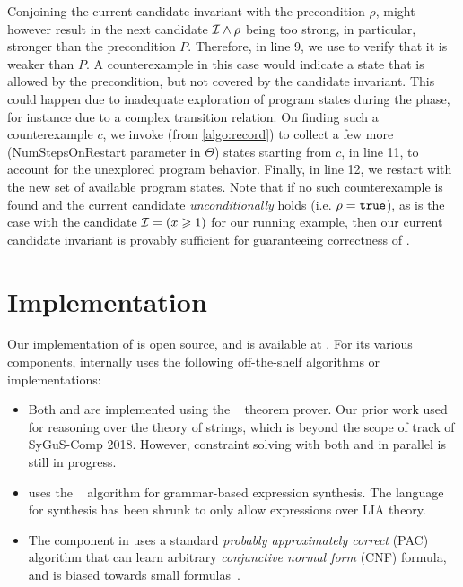 \documentclass[conference]{IEEEtran}
\begin{document}
Conjoining the current candidate invariant \Inv with the precondition $\rho$,
might however result in the next candidate $\mathcal{I} \wedge \rho$ being too strong,
in particular, stronger than the precondition $P$.
Therefore, in line 9, we use \Checker to verify that it is weaker than $P$.
A counterexample in this case would indicate a state that is allowed by the precondition,
but not covered by the candidate invariant.
This could happen due to inadequate exploration of program states during the \Record phase,
for instance due to a complex transition relation.
On finding such a counterexample $c$, we invoke \RecordStatesFrom (from \cref{algo:record})
to collect a few more (\textsf{\small NumStepsOnRestart} parameter in $\Theta$) states starting from $c$,
in line 11, to account for the unexplored program behavior.
Finally, in line 12, we restart with the new set of available program states.
Note that if no such counterexample is found and the current candidate \emph{unconditionally} holds (i.e. $\rho = \texttt{true}$),
as is the case with the candidate $\mathcal{I} = (x \geqslant 1)$ for our running example, then
our current candidate invariant is provably sufficient for guaranteeing correctness of \SyGuSINVQuadruplet.





\section{Implementation} \label{subsec:Implementation}

\noindent
Our implementation of \LoopInvGen is open source, and is available at {\small {}}.
For its various components, \LoopInvGen internally uses the following off-the-shelf algorithms or implementations:
\begin{itemize}
    \item Both \GetModel and \Checker are implemented using the ~\citep{Moura2008Z3AE} theorem prover.
          Our prior work used ~\citep{Barrett2011CVC4} for reasoning over the theory of strings,
          which is beyond the scope of \INV track of SyGuS-Comp 2018.
          However, constraint solving with both  and  in parallel is still in progress.
    
    \item \PIE uses the \HEnum~\citep{Padhi2019OverfittingSTP} algorithm for grammar-based expression synthesis.
          The language for synthesis has been shrunk to only allow expressions over LIA theory.
    
    \item The \BFL component in \PIE uses a standard \emph{probably approximately correct} (PAC) algorithm
          that can learn arbitrary \emph{conjunctive normal form} (CNF) formula,
          and is biased towards small formulas~\citep{Kearns1994AnIT}.
\end{itemize}
\end{document}

